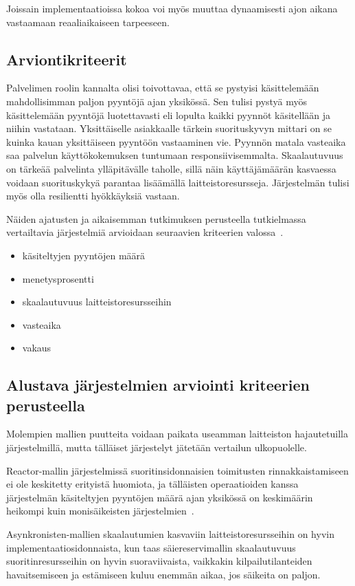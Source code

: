 \documentclass[12pt]{article}
\begin{document}
Joissain implementaatioissa kokoa voi myös muuttaa dynaamisesti ajon aikana vastaamaan
reaaliaikaiseen tarpeeseen.

\subsection{Arviontikriteerit}
Palvelimen roolin kannalta olisi toivottavaa, että
se pystyisi käsittelemään mahdollisimman paljon pyyntöjä
ajan yksikössä. Sen tulisi pystyä myös käsittelemään pyyntöjä
luotettavasti eli lopulta kaikki pyynnöt käsitellään ja niihin vastataan.
Yksittäiselle asiakkaalle tärkein suorituskyvyn mittari on se kuinka kauan
yksittäiseen pyyntöön vastaaminen vie. Pyynnön matala vasteaika saa
palvelun käyttökokemuksen tuntumaan responsiivisemmalta.
Skaalautuvuus on tärkeää palvelinta ylläpitävälle taholle, sillä
näin käyttäjämäärän kasvaessa voidaan suorituskykyä parantaa
lisäämällä laitteistoresursseja. Järjestelmän tulisi myös
olla resilientti hyökkäyksiä vastaan.

Näiden ajatusten ja aikaisemman tutkimuksen perusteella
tutkielmassa vertailtavia järjestelmiä arvioidaan seuraavien
kriteerien valossa~\cite{gokhale_performance_2006}.
\begin{itemize}
    \item käsiteltyjen pyyntöjen määrä
    \item menetysprosentti
    \item skaalautuvuus laitteistoresursseihin
    \item vasteaika
    \item vakaus
\end{itemize}
\subsection{Alustava järjestelmien arviointi kriteerien perusteella}
Molempien mallien puutteita voidaan paikata useamman laitteiston hajautetuilla
järjestelmillä, mutta tälläiset järjestelyt jätetään vertailun ulkopuolelle.

Reactor-mallin järjestelmissä suoritinsidonnaisien
toimitusten rinnakkaistamiseen ei ole keskitetty erityistä huomiota, ja tälläisten operaatioiden
kanssa järjestelmän käsiteltyjen pyyntöjen määrä ajan yksikössä on keskimäärin heikompi
kuin monisäikeisten järjestelmien~\cite{davis_case_2017}.

Asynkronisten-mallien skaalautumien kasvaviin laitteistoresursseihin on hyvin
implementaatiosidonnaista, kun taas
säiereservimallin skaalautuvuus suoritinresursseihin on hyvin suoraviivaista,
vaikkakin kilpailutilanteiden havaitsemiseen ja estämiseen kuluu enemmän aikaa,
jos säikeita on paljon.
\end{document}
